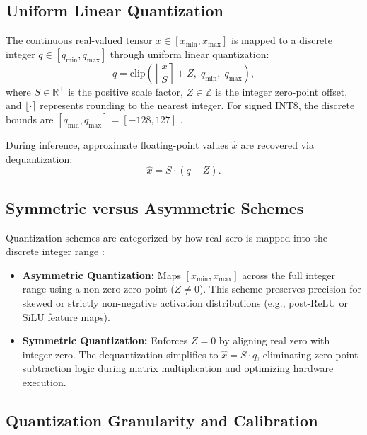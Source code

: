 \subsection{Uniform Linear Quantization}

The continuous real-valued tensor $x \in [x_{\min}, x_{\max}]$ is mapped to a discrete integer $q \in [q_{\min}, q_{\max}]$ through uniform linear quantization:
\begin{equation}
q = \text{clip}\left( \left\lfloor \frac{x}{S} \right\rceil + Z, \; q_{\min}, \; q_{\max} \right),
\end{equation}
where $S \in \mathbb{R}^{+}$ is the positive scale factor, $Z \in \mathbb{Z}$ is the integer zero-point offset, and $\lfloor \cdot \rceil$ represents rounding to the nearest integer. For signed $\text{INT8}$, the discrete bounds are $[q_{\min}, q_{\max}] = [-128, 127]$ \cite{Krishnamoorthi2018}. 

During inference, approximate floating-point values $\hat{x}$ are recovered via dequantization:
\begin{equation}
\hat{x} = S \cdot (q - Z).
\end{equation}
\subsection{Symmetric versus Asymmetric Schemes}

Quantization schemes are categorized by how real zero is mapped into the discrete integer range \cite{Nagel2021}:
\begin{itemize}
    \item \textbf{Asymmetric Quantization:} Maps $[x_{\min}, x_{\max}]$ across the full integer range using a non-zero zero-point ($Z \neq 0$). This scheme preserves precision for skewed or strictly non-negative activation distributions (e.g., post-$\text{ReLU}$ or $\text{SiLU}$ feature maps).
    \item \textbf{Symmetric Quantization:} Enforces $Z = 0$ by aligning real zero with integer zero. The dequantization simplifies to $\hat{x} = S \cdot q$, eliminating zero-point subtraction logic during matrix multiplication and optimizing hardware execution.
\end{itemize}

\subsection{Quantization Granularity and Calibration}

